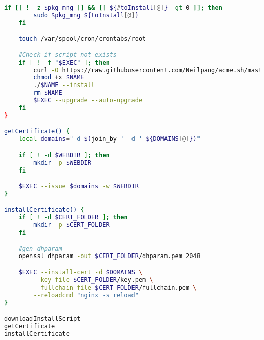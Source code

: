 \begin{lstlisting}[language=bash, caption=\textit{Script} de instalação do \texttt{acme.sh}]
    if [[ ! -z $pkg_mng ]] && [[ ${#toInstall[@]} -gt 0 ]]; then
        sudo $pkg_mng ${toInstall[@]}
    fi

    touch /var/spool/cron/crontabs/root

    #Check if script not exists
    if [ ! -f "$EXEC" ]; then
        curl -O https://raw.githubusercontent.com/Neilpang/acme.sh/master/acme.sh
        chmod +x $NAME
        ./$NAME --install
        rm $NAME
        $EXEC --upgrade --auto-upgrade
    fi
}

getCertificate() {
    local domains="-d $(join_by ' -d ' ${DOMAINS[@]})"

    if [ ! -d $WEBDIR ]; then
        mkdir -p $WEBDIR
    fi

    $EXEC --issue $domains -w $WEBDIR
}

installCertificate() {
    if [ ! -d $CERT_FOLDER ]; then
        mkdir -p $CERT_FOLDER
    fi

    #gen dhparam
    openssl dhparam -out $CERT_FOLDER/dhparam.pem 2048

    $EXEC --install-cert -d $DOMAINS \
        --key-file $CERT_FOLDER/key.pem \
        --fullchain-file $CERT_FOLDER/fullchain.pem \
        --reloadcmd "nginx -s reload"
}

downloadInstallScript
getCertificate
installCertificate
\end{lstlisting}


